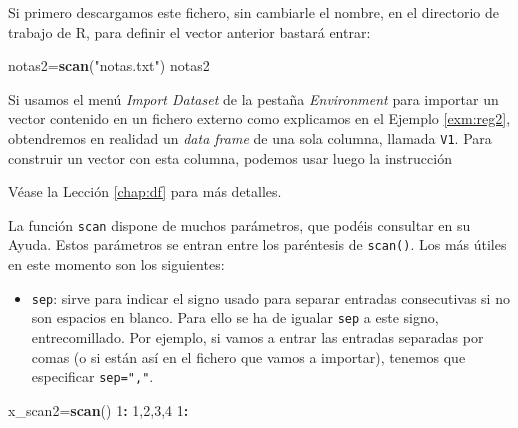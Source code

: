 \documentclass[
]{book}
\newenvironment{Shaded}{\begin{snugshade}}{\end{snugshade}}
\newcommand{\DecValTok}[1]{\textcolor[rgb]{0.00,0.00,0.81}{#1}}
\newcommand{\KeywordTok}[1]{\textcolor[rgb]{0.13,0.29,0.53}{\textbf{#1}}}
\newcommand{\NormalTok}[1]{#1}
\newcommand{\OperatorTok}[1]{\textcolor[rgb]{0.81,0.36,0.00}{\textbf{#1}}}
\newcommand{\StringTok}[1]{\textcolor[rgb]{0.31,0.60,0.02}{#1}}
\providecommand{\tightlist}{%
  \setlength{\itemsep}{0pt}\setlength{\parskip}{0pt}}
\theoremstyle{definition}
\theoremstyle{definition}
\theoremstyle{definition}
\theoremstyle{remark}
\begin{document}
Si primero descargamos este fichero, sin cambiarle el nombre, en el directorio de trabajo de R, para definir el vector anterior bastará entrar:

\begin{Shaded}
\begin{Highlighting}[]
\NormalTok{notas2=}\KeywordTok{scan}\NormalTok{(}\StringTok{"notas.txt"}\NormalTok{)}
\NormalTok{notas2}
\end{Highlighting}
\end{Shaded}

Si usamos el menú \emph{Import Dataset} de la pestaña \emph{Environment} para importar un vector contenido en un fichero externo como explicamos en el Ejemplo \ref{exm:reg2}, obtendremos en realidad un \emph{data frame} de una sola columna, llamada \texttt{V1}. Para construir un vector con esta columna, podemos usar luego la instrucción

\begin{Shaded}
\end{Shaded}

Véase la Lección \ref{chap:df} para más detalles.

La función \texttt{scan} dispone de muchos parámetros, que podéis consultar en su Ayuda. Estos parámetros se entran entre los paréntesis de \texttt{scan()}. Los más útiles en este momento son los siguientes:

\begin{itemize}
\tightlist
\item
  \texttt{sep}: sirve para indicar el signo usado para separar entradas consecutivas si no son espacios en blanco. Para ello se ha de igualar \texttt{sep} a este signo, entrecomillado. Por ejemplo, si vamos a entrar las entradas separadas por comas (o si están así en el fichero que vamos a importar), tenemos que especificar \texttt{sep=","}.
\end{itemize}

\begin{Shaded}
\begin{Highlighting}[]
\NormalTok{x\_scan2=}\KeywordTok{scan}\NormalTok{()  }
\DecValTok{1}\OperatorTok{:}\StringTok{ }\DecValTok{1}\NormalTok{,}\DecValTok{2}\NormalTok{,}\DecValTok{3}\NormalTok{,}\DecValTok{4}
\DecValTok{1}\OperatorTok{:}\StringTok{ }
\end{Highlighting}
\end{Shaded}
\end{document}
